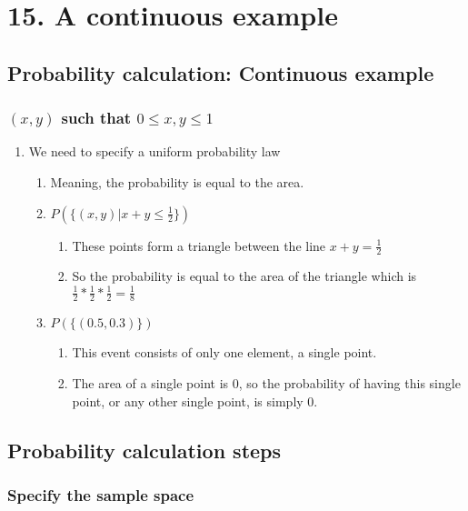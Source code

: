 \documentclass[11pt]{article}
\begin{document}
\section{15. A continuous example}
\label{sec:orgaab2a89}
\subsection{Probability calculation: Continuous example}
\label{sec:org4066f05}
\subsubsection{\(\left( x,y \right)\) such that \(0 \le x,y \le 1\)}
\label{sec:org341f14b}
\begin{enumerate}
\item We need to specify a uniform probability law
\label{sec:org1e90e5b}
\begin{enumerate}
\item Meaning, the probability is equal to the area.
\label{sec:org96f3989}
\item \(P( \{\left( x,y \right) | x+y \le \frac{1}{2} \} )\)
\label{sec:orgce6ffb6}
\begin{enumerate}
\item These points form a triangle between the line \(x+y=\frac{1}{2}\)
\label{sec:orge943757}
\item So the probability is equal to the area of the triangle which is \(\frac{1}{2} * \frac{1}{2} * \frac{1}{2} = \frac{1}{8}\)
\label{sec:org8328f73}
\end{enumerate}
\item \(P(\{\left( 0.5,0.3 \right)\})\)
\label{sec:org730bca6}
\begin{enumerate}
\item This event consists of only one element, a single point.
\label{sec:orgc05b44e}
\item The area of a single point is 0, so the probability of having this single point, or any other single point, is simply 0.
\label{sec:orgd76ced4}
\end{enumerate}
\end{enumerate}
\end{enumerate}
\subsection{Probability calculation steps}
\label{sec:org7d7ef1f}
\subsubsection{Specify the sample space}
\label{sec:org39db1ea}
\end{document}
